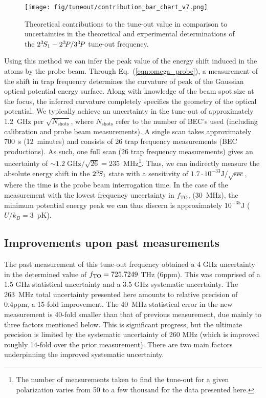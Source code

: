 	\begin{figure}[t]
	    \centering
	    \texttt{[image: fig/tuneout/contribution\_bar\_chart\_v7.png]}
	    \caption{Theoretical contributions to the tune-out value in comparison to uncertainties in the theoretical and experimental determinations of the \(2^{3\!}S_1- 2^{3\!}P / 3^{3\!}P\) tune-out frequency.}
	    \label{fig:contributions}
	\end{figure}


	
	Using this method we can infer the peak value of the energy shift induced in the atoms by the probe beam. 
	Through Eq.~(\ref{eqn:omega_probe}), a measurement of the shift in trap frequency determines the curvature of peak of the Gaussian optical potential energy surface. 
	Along with knowledge of the beam spot size at the focus, the inferred curvature completely specifies the geometry of the optical potential. 
	We typically achieve an uncertainty in the tune-out of approximately 1.2~$\text{GHz}$ per $\sqrt{N_\text{shots}}$, where \(N_\text{shots}\) refer to the number of BEC's used (including calibration and probe beam measurements). 
	A single scan takes approximately 700~s (12~minutes) and consists of 26 trap frequency measurements (BEC productions). 
	As such, one full scan (26 trap frequency measurements) gives an uncertainty of $\sim 1.2\;\mathrm{GHz}/\sqrt{26}=235$~MHz\footnote{The number of measurements taken to find the tune-out for a given polarization varies from 50 to a few thousand for the data presented here.}.
	Thus, we can indirectly measure the absolute energy shift in the $2^{3\!}S_1$ state with a sensitivity of $1.7\cdot10^{-33}\mathrm{J}/\sqrt{\mathrm{sec}}$, where the time is the probe beam interrogation time. 
	In the case of the measurement with the lowest frequency uncertainty in $f_\textrm{TO}$, (30~MHz), the minimum potential energy peak we can thus discern is approximately $10^{-35}\mathrm{J}$ ($U/k_B=3$~pK).

\subsection{Improvements upon past measurements}

	The past measurement of this tune-out frequency \cite{Henson15} obtained a 4 GHz uncertainty in the determined value of $f_\mathrm{TO} = 725.7249$ THz (6ppm). This was comprised of a 1.5 GHz statistical uncertainty and a 3.5 GHz systematic uncertainty. 
	The 263~MHz total uncertainty presented here amounts to relative precision of 0.4ppm, a 15-fold improvement. 
	The 40~MHz statistical error in the new measurement is 40-fold smaller than that of previous measurement, due mainly to three factors mentioned below. This is significant progress, but the ultimate precision is limited by the systematic uncertainty of 260 MHz (which is improved roughly 14-fold over the prior measurement).	There are two main factors underpinning the improved systematic uncertainty.

